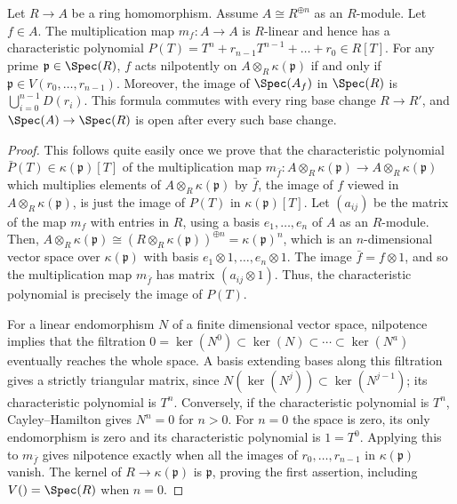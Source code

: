 \begin{lemma}
\label{lemma-characteristic-polynomial-prime}
Let $R \to A$ be a ring homomorphism.
Assume $A \cong R^{\oplus n}$ as an $R$-module.
Let $f \in A$. The multiplication map $m_f: A
\to A$ is $R$-linear and hence
has a characteristic polynomial
$P(T) = T^n + r_{n-1}T^{n-1} + \ldots + r_0 \in R[T]$.
For any prime
$\mathfrak{p} \in \Spec(R)$, $f$ acts nilpotently on $A
\otimes_R \kappa(\mathfrak{p})$ if and only if $\mathfrak p \in
V(r_0, \ldots, r_{n-1})$.
Moreover, the image of $\Spec(A_f)$ in $\Spec(R)$ is
$\bigcup_{i=0}^{n-1}D(r_i)$. This formula commutes with every ring
base change $R\to R'$, and $\Spec(A)\to\Spec(R)$ is open after every
such base change.
\end{lemma}

\begin{proof}
This follows quite easily once we prove that the characteristic
polynomial $\bar P(T) \in \kappa(\mathfrak p)[T]$ of the
multiplication map $m_{\bar f}: A \otimes_R \kappa(\mathfrak p) \to
A \otimes_R \kappa(\mathfrak p)$ which multiplies elements of $A
\otimes_R \kappa(\mathfrak p)$ by $\bar f$, the image of $f$ viewed in
$A\otimes_R\kappa(\mathfrak p)$, is just the image of $P(T)$ in
$\kappa(\mathfrak p)[T]$. Let $(a_{ij})$ be the matrix of the map
$m_f$ with entries in $R$, using a basis $e_1, \ldots, e_n$
of $A$ as an $R$-module.
Then, $A \otimes_R \kappa(\mathfrak p) \cong (R \otimes_R
\kappa(\mathfrak p))^{\oplus n} = \kappa(\mathfrak p)^n$, which is
an $n$-dimensional vector space over $\kappa(\mathfrak p)$ with
basis $e_1 \otimes 1, \ldots, e_n \otimes 1$. The image $\bar f = f
\otimes 1$, and so the multiplication map $m_{\bar f}$ has matrix
$(a_{ij} \otimes 1)$. Thus, the characteristic polynomial is
precisely the image of $P(T)$.

\medskip\noindent
For a linear endomorphism $N$ of a finite dimensional vector space,
nilpotence implies that the filtration
$0=\ker(N^0)\subset\ker(N)\subset\cdots\subset\ker(N^a)$
eventually reaches the whole space. A basis extending bases along this
filtration gives a strictly triangular matrix, since
$N(\ker(N^j))\subset\ker(N^{j-1})$; its characteristic polynomial
is $T^n$. Conversely, if the characteristic polynomial is $T^n$,
Cayley--Hamilton gives $N^n=0$ for $n>0$.
For $n=0$ the space is zero, its only endomorphism is zero and its
characteristic polynomial is $1=T^0$. Applying this to $m_{\bar f}$
gives nilpotence exactly when all the images of
$r_0,\ldots,r_{n-1}$ in $\kappa(\mathfrak p)$ vanish.
The kernel of $R\to\kappa(\mathfrak p)$ is $\mathfrak p$, proving
the first assertion, including $V()=\Spec(R)$ when $n=0$.


\end{proof}
